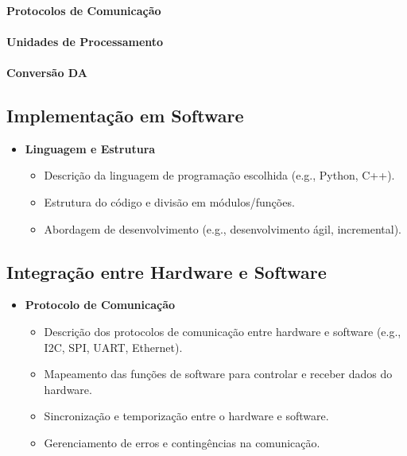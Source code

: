     
    \paragraph{Protocolos de Comunicação}
    \paragraph{Unidades de Processamento}
    \paragraph{Conversão DA}
    
    
    \subsection{Implementação em Software}
    
    \begin{itemize}
        \item \textbf{Linguagem e Estrutura}
        \begin{itemize}
            \item Descrição da linguagem de programação escolhida (e.g., Python, C++).
            \item Estrutura do código e divisão em módulos/funções.
            \item Abordagem de desenvolvimento (e.g., desenvolvimento ágil, incremental).
        \end{itemize}
    \end{itemize}
    
    \subsection{Integração entre Hardware e Software}
    
    \begin{itemize}
        \item \textbf{Protocolo de Comunicação}
        \begin{itemize}
            \item Descrição dos protocolos de comunicação entre hardware e software (e.g., I2C, SPI, UART, Ethernet).
            \item Mapeamento das funções de software para controlar e receber dados do hardware.
            \item Sincronização e temporização entre o hardware e software.
            \item Gerenciamento de erros e contingências na comunicação.
        \end{itemize}
    \end{itemize}
    
